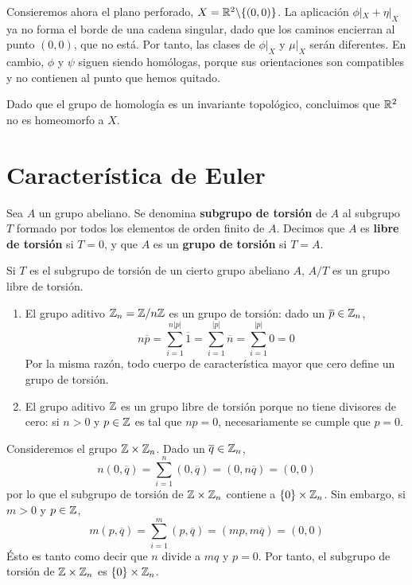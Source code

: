 Consieremos ahora el plano perforado, $X=\mathbb{R}^2\backslash\{(0,0)\}$. La
aplicación $\phi|_X+\eta|_X$ ya no forma el borde de una cadena singular, dado
que los caminos encierran al punto $(0,0)$, que no está. Por tanto, las clases
de $\phi|_X$ y $\mu|_X$ serán diferentes. En cambio, $\phi$ y $\psi$ siguen
siendo homólogas, porque sus orientaciones son compatibles y no contienen al
punto que hemos quitado.

Dado que el grupo de homología es un invariante topológico, concluimos que
$\mathbb{R}^2$ no es homeomorfo a $X$.

\section{Característica de Euler}
\begin{definition}
Sea $A$ un grupo abeliano. Se denomina \textbf{subgrupo de torsión} de $A$ al
subgrupo $T$ formado por todos los elementos de orden finito de $A$. Decimos que
$A$ es \textbf{libre de torsión} si $T=0$, y que $A$ es un \textbf{grupo de
torsión} si $T=A$.
\end{definition}

Si $T$ es el subgrupo de torsión de un cierto grupo abeliano $A$,
$A/T$ es un grupo libre de torsión.

\begin{example}
\begin{enumerate}
\item El grupo aditivo $\mathbb{Z}_n=\mathbb{Z}/n\mathbb{Z}$ es un grupo de torsión: dado un $\overline{p} \in
\mathbb{Z}_n$,
\[n\overline{p}=\sum^{n|p|}_{i=1}\overline{1}=\sum^{|p|}_{i=1}\overline{n}=
\sum^{|p|}_{i=1}0=0\]
Por la misma razón, todo cuerpo de característica mayor que cero define un grupo de torsión.
\item El grupo aditivo $\mathbb{Z}$ es un grupo libre de torsión porque no tiene divisores de cero: si $n > 0$ y $p \in \mathbb{Z}$ es tal que $np=0$, necesariamente se cumple que $p=0$.
\end{enumerate}
\end{example}

\begin{example}
Consideremos el grupo $\mathbb{Z}\times \mathbb{Z}_n$. Dado un $\overline{q} \in \mathbb{Z}_n$,
\[n(0,\overline{q})=\sum^n_{i=1}(0,\overline{q})=(0,n\overline{q})=(0,0)\]
por lo que el subgrupo de torsión de $\mathbb{Z}\times \mathbb{Z}_n$ contiene a
$\{0\}\times\mathbb{Z}_n$. Sin embargo, si $m > 0$ y $p \in \mathbb{Z}$,
\[m(p,\overline{q})=\sum^m_{i=1}(p,\overline{q})=(mp,m\overline{q})=(0,0)\]
Ésto es tanto como decir que $n$ divide a $mq$ y $p=0$. Por tanto, el subgrupo
de torsión de $\mathbb{Z}\times \mathbb{Z}_n$ es $\{0\}\times\mathbb{Z}_n$.
\end{example}

